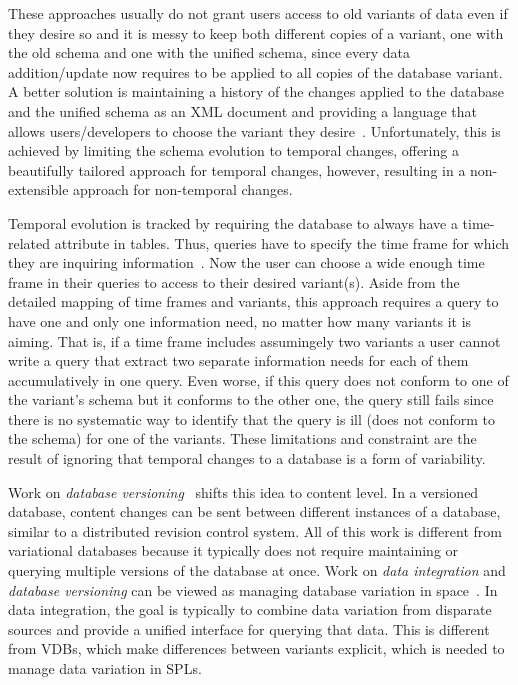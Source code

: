 These approaches usually do not
grant users access to old variants of data even if they desire so and it
is messy to keep both different copies of a variant, one with the old schema
and one with the unified schema, since every data addition/update now requires to 
be applied to all copies of the database variant. A better solution
is maintaining a history of the changes applied to the database and the unified schema
as an XML document and providing a language that allows users/developers to choose
the variant they desire~\cite{prima08Moon}. Unfortunately, this is achieved by limiting
the schema evolution to temporal changes, offering a beautifully tailored approach for 
temporal changes, however, resulting in a non-extensible approach for non-temporal changes.

Temporal evolution is tracked by requiring the database to always have a time-related 
attribute in tables. Thus, queries have to specify the time frame for which they are inquiring 
information~\cite{prima08Moon}. 
Now the user can choose a wide enough time frame in their queries to access 
to their desired variant(s). Aside from the detailed mapping of time frames and variants, this
approach requires a query to have one and only one information need, no matter how many
variants it is aiming. That is, if a time frame includes assumingely two variants a user cannot 
write a query that extract two separate information needs for each of them accumulatively 
in one query. Even worse, if this query does not conform to one of the variant's schema
but it conforms to the other one, the query still fails since there is no systematic way to 
identify that the query is ill (does not conform to the schema) for one of the variants. 
These limitations and constraint are the result of ignoring that temporal changes to a 
database is a form of variability.

%
Work on \emph{database versioning}~\cite{datasetVersioning,dbVersioning}
shifts this idea to content level. In a versioned database, 
content changes can be sent between different instances of a database,
similar to a distributed revision control system.
%
All of this work is different from variational databases because it typically
does not require maintaining or querying multiple versions of the database at
once.
%
Work on \emph{data integration} and \emph{database versioning} can be viewed as
managing database variation in space~\cite{dataIntegBook}. In data integration,
the goal is typically to combine data variation from disparate sources and
provide a unified interface for querying that data. This is different from
VDBs, which make differences between variants explicit, which is needed to
manage data variation in SPLs.

